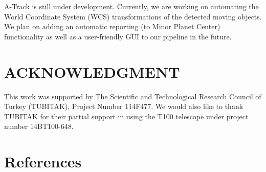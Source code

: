 \documentclass[review]{elsarticle}
\begin{document}
A-Track is still under development. Currently, we are working on automating the World Coordinate System (WCS) transformations of the detected moving objects. We plan on adding an automatic reporting (to Minor Planet Center) functionality as well as a user-friendly GUI to our pipeline in the future.


\section*{ACKNOWLEDGMENT}

This work was supported by The Scientific and Technological Research Council of Turkey (TUBITAK), Project Number 114F477. We would also like to thank TUBITAK for their partial support in using the T100 telescope under project number 14BT100-648.

\section*{References}


\end{document}
